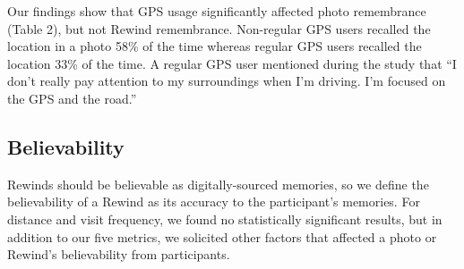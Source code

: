 \documentclass{sigchi}
\begin{document}
Our findings show that GPS usage significantly affected photo remembrance (Table 2), but not Rewind remembrance. Non-regular GPS users recalled the location in a photo 58\% of the time whereas regular GPS users recalled the location 33\% of the time. A regular GPS user mentioned during the study that ``I don't really pay attention to my surroundings when I'm driving. I'm focused on the GPS and the road.'' 




\subsection{Believability}
Rewinds should be believable as digitally-sourced memories, so we define the believability of a Rewind as its accuracy to the participant's memories. For distance and visit frequency, we found no statistically significant results, but in addition to our five metrics, we solicited other factors that affected a photo or Rewind's believability from participants.

\end{document}
